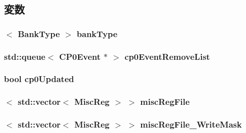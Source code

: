 \subsection{変数}
\hypertarget{classMipsISA_1_1ISA_adf99e34b7a92591520cf8908417e9154}{
\subsubsection[{bankType}]{$<$ {\bf BankType} $>$ {\bf bankType}}}
\label{classMipsISA_1_1ISA_adf99e34b7a92591520cf8908417e9154}
\hypertarget{classMipsISA_1_1ISA_a8adab10ee83d624a89033e9d1979662e}{
\subsubsection[{cp0EventRemoveList}]{\setlength{\rightskip}{0pt plus 5cm}std::queue$<$ {\bf CP0Event} $\ast$ $>$ {\bf cp0EventRemoveList}}}
\label{classMipsISA_1_1ISA_a8adab10ee83d624a89033e9d1979662e}
\hypertarget{classMipsISA_1_1ISA_a92cda46eabfff2a3514c1c2721e25990}{
\subsubsection[{cp0Updated}]{\setlength{\rightskip}{0pt plus 5cm}bool {\bf cp0Updated}}}
\label{classMipsISA_1_1ISA_a92cda46eabfff2a3514c1c2721e25990}
\hypertarget{classMipsISA_1_1ISA_a02abb0f7fcd403c7ec4810a93f77ec60}{
\subsubsection[{miscRegFile}]{$<$ {\bf std::vector}$<$ {\bf MiscReg} $>$ $>$ {\bf miscRegFile}}}
\label{classMipsISA_1_1ISA_a02abb0f7fcd403c7ec4810a93f77ec60}
\hypertarget{classMipsISA_1_1ISA_a53b478f356b8709271f5f00b99473458}{
\subsubsection[{miscRegFile\_\-WriteMask}]{$<$ {\bf std::vector}$<$ {\bf MiscReg} $>$ $>$ {\bf miscRegFile\_\-WriteMask}}}
